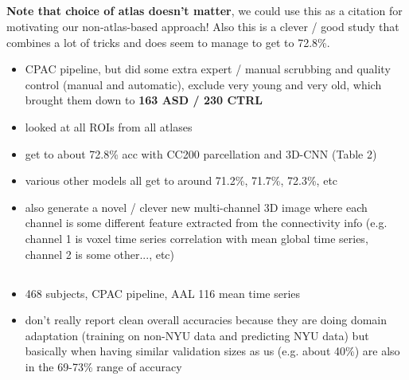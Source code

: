 \documentclass[10pt]{article}
\begin{document}
\subsection{\citet{khoslaEnsembleLearning3D2019}}

\textbf{Note that choice of atlas doesn't matter}, we could use this as a citation for motivating
our non-atlas-based approach! Also this is a clever / good study that combines a lot of tricks and does seem to manage to get to 72.8\%.

\begin{itemize}
  \item CPAC pipeline, but did some extra expert / manual scrubbing and quality control (manual and
  automatic), exclude very young and very old, which brought them down to  \textbf{163 ASD / 230
  CTRL}
  \item looked at all ROIs from all atlases
  \item get to about 72.8\% acc with CC200 parcellation and 3D-CNN (Table 2)
  \item various other models all get to around 71.2\%, 71.7\%, 72.3\%, etc
  \item also generate a novel / clever new multi-channel 3D image where each channel is some different
  feature extracted from the connectivity info (e.g. channel 1 is voxel time series correlation with mean global time series, channel 2 is some other..., etc)
\end{itemize}

\subsection{\citet{wangIdentifyingAutismSpectrum2020}}

\begin{itemize}
  \item 468 subjects, CPAC pipeline, AAL 116 mean time series
  \item don't really report clean overall accuracies because they are doing domain adaptation
  (training on non-NYU data and predicting NYU data) but basically when having similar validation
  sizes as us (e.g. about 40\%) are also in the 69-73\% range of accuracy
\end{itemize}

\subsection{\citet{sherkatghanadAutomatedDetectionAutism2020}}
\end{document}
